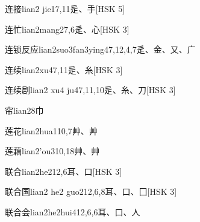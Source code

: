 \begin{entry}{连接}{lian2 jie1}{7,11}{⾡、⼿}[HSK 5]
\end{entry}

\begin{entry}{连忙}{lian2mang2}{7,6}{⾡、⼼}[HSK 3]
\end{entry}

\begin{entry}{连锁反应}{lian2suo3fan3ying4}{7,12,4,7}{⾡、⾦、⼜、⼴}
\end{entry}

\begin{entry}{连续}{lian2xu4}{7,11}{⾡、⽷}[HSK 3]
\end{entry}

\begin{entry}{连续剧}{lian2 xu4 ju4}{7,11,10}{⾡、⽷、⼑}[HSK 3]
\end{entry}

\begin{entry}{帘}{lian2}{8}{⼱}
\end{entry}

\begin{entry}{莲花}{lian2hua1}{10,7}{⾋、⾋}
\end{entry}

\begin{entry}{莲藕}{lian2'ou3}{10,18}{⾋、⾋}
\end{entry}

\begin{entry}{联合}{lian2he2}{12,6}{⽿、⼝}[HSK 3]
\end{entry}

\begin{entry}{联合国}{lian2 he2 guo2}{12,6,8}{⽿、⼝、⼞}[HSK 3]
\end{entry}

\begin{entry}{联合会}{lian2he2hui4}{12,6,6}{⽿、⼝、⼈}
\end{entry}

